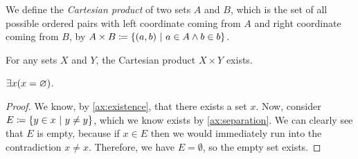 % 
%         
% 
% 
% 

\begin{definition}
    We define the \emph{Cartesian product} of two sets $A$ and $B$,
    which is the set of all possible ordered pairs with
    left coordinate coming from $A$ and right coordinate coming from $B$,
    by $A \times B \defn \set*{(a, b) \suchthat a \in A \meet b \in b}$.
\end{definition}

\begin{theorem}
    For any sets $X$ and $Y$, the Cartesian product $X \times Y$ exists.
\end{theorem}

\begin{theorem}
    $\exists x \pn*{x = \emptyset}$.
\end{theorem}
\begin{proof}
    We know, by \autoref{ax:existence}, that there exists a set $x$.
    Now, consider $E \defn \set*{y \in x \suchthat  y \neq y}$,
    which we know exists by \autoref{ax:separation}.
    We can clearly see that $E$ is empty,
    because if $x \in E$ then we would immediately run into the contradiction $x \neq x$.
    Therefore, we have $E = \emptyset$, so the empty set exists.
\end{proof}

